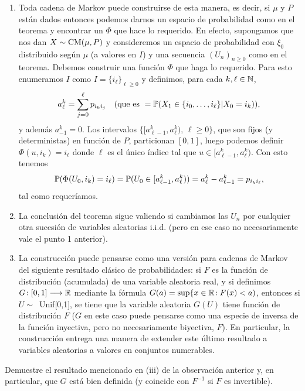 \begin{rem}
\leavevmode
\begin{enumerate}
\item Toda cadena de Markov puede construirse de esta manera, es decir, si $\mu$ y $P$ están dados entonces podemos darnos un espacio de probabilidad como en el teorema y encontrar un $\Phi$ que hace lo requerido.
\lsep
En efecto, supongamos que nos dan $X\sim\text{\upshape{CM}}(\mu,P)$ y consideremos un espacio de probabilidad con $\xi_0$ distribuido según $\mu$ (a valores en $I$) y una secuencia $(U_n)_{n\geq0}$ como en el teorema.
Debemos construir una función $\Phi$ que haga lo requerido.
Para esto enumeramos $I$ como $I=\{i_\ell\}_{\ell\geq0}$ y definimos, para cada $k,\ell\in\mathbb{N}$,
\[a^{k}_\ell=\sum_{j=0}^\ell p_{i_ki_j}\quad\text{\upshape{(que es }}=\mathbb{P}(X_1\in\{i_0,\dotsc,i_\ell\}|X_0=i_k)\text{\upshape{)}},\]
y además $a^k_{-1}=0$.
Los intervalos $\{[a^k_{\ell-1},a^k_\ell),\,\ell\geq0\}$, que son fijos (y deterministas) en función de $P$, particionan $[0,1]$, luego podemos definir $\Phi(u,i_k)=i_\ell$ donde $\ell$ es el único índice tal que $u\in[a^k_{\ell-1},a^k_\ell)$.
Con esto tenemos
\[\mathbb{P}(\Phi(U_0,i_k)=i_\ell)=\mathbb{P}(U_0\in[a^k_{\ell-1},a^k_\ell))=a^k_\ell-a^k_{\ell-1}=p_{i_ki_\ell},\]
tal como requeríamos.
\item La conclusión del teorema sigue valiendo si cambiamos las $U_n$ por cualquier otra sucesión de variables aleatorias i.i.d. (pero en ese caso no necesariamente vale el punto 1 anterior).
\item La construcción puede pensarse como una versión para cadenas de Markov del siguiente resultado clásico de probabilidades: si $F$ es  la función de distribución (acumulada) de una variable aleatoria real, y si definimos $G\!:[0,1]\longrightarrow\mathbb{R}$ mediante la fórmula $G(a)=\sup\{x\in\mathbb{R}\!:F(x)<a)$, entonces si $U\sim$~Unif[0,1], se tiene que la variable aleatoria $G(U)$ tiene función de distribución $F$ ($G$ en este caso puede pensarse como una especie de inversa de la función inyectiva, pero no necesariamente biyectiva, $F$).
\lsep 
En particular, la construcción entrega una manera de extender este último resultado a variables aleatorias a valores en conjuntos numerables.
\end{enumerate}
\end{rem}

\begin{exer}
Demuestre el resultado mencionado en (iii) de la observación anterior y, en particular, que $G$ está bien definida (y coincide con $F^{-1}$ si $F$ es invertible).
\end{exer}

